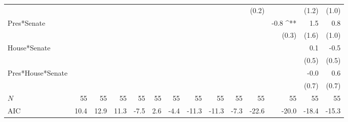 \documentclass[a4paper]{article}\usepackage{graphicx, color}
\begin{document}
\begin{table}[ht]
\begin{center}
{\begin{tabular}{ l D{.}{.}{1}D{.}{.}{1}D{.}{.}{1}D{.}{.}{1}D{.}{.}{1}D{.}{.}{1}D{.}{.}{1}D{.}{.}{1}D{.}{.}{1}D{.}{.}{1}D{.}{.}{1}D{.}{.}{1}D{.}{.}{1} }
                     &                 &                 &                 &                 &                 &                 &                 &                 &                 & (0.2)           &                 & (1.2)           & (1.0)          \\ 
Pres*Senate          &                 &                 &                 &                 &                 &                 &                 &                 &                 &                 & -0.8 ^{**}      & 1.5             & 0.8            \\ 
                     &                 &                 &                 &                 &                 &                 &                 &                 &                 &                 & (0.3)           & (1.6)           & (1.0)          \\ 
House*Senate         &                 &                 &                 &                 &                 &                 &                 &                 &                 &                 &                 & 0.1             & -0.5           \\ 
                     &                 &                 &                 &                 &                 &                 &                 &                 &                 &                 &                 & (0.5)           & (0.5)          \\ 
Pres*House*Senate    &                 &                 &                 &                 &                 &                 &                 &                 &                 &                 &                 & -0.0            & 0.6            \\ 
                     &                 &                 &                 &                 &                 &                 &                 &                 &                 &                 &                 & (0.7)           & (0.7)           \\
 $N$                  & 55              & 55              & 55              & 55              & 55              & 55              & 55              & 55              & 55              & 55              & 55              & 55              & 55             \\ 
AIC                  & 10.4            & 12.9            & 11.3            & -7.5            & 2.6             & -4.4            & -11.3           & -11.3           & -7.3            & -22.6           & -20.0           & -18.4           & -15.3          \\ 

\end{tabular}}
\end{center}
\end{table}
\end{document}
